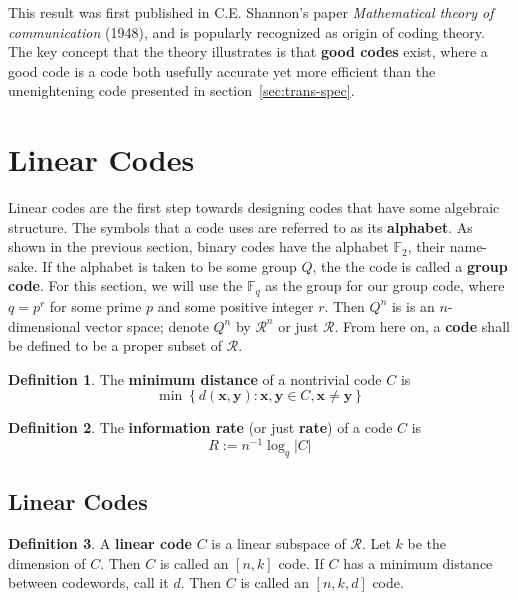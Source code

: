 \documentclass{article}
\newcommand{\F}{\mathbb{F}}
\newcommand{\calR}{\mathcal{R}}
\renewcommand{\=}{\equiv}
\renewcommand{\i}{^{-1}}
\newcommand{\set}[1]{\left\{ #1 \right\}}
\renewcommand{\v}{\mathbf}
\newcommand{\x}{{\v x}}
\newcommand{\y}{{\v y}}
\theoremstyle{plain}
\theoremstyle{definition}
\newtheorem{defn}{Definition}[subsection]
\begin{document}
This result was first published in C.E. Shannon's paper \textit{Mathematical theory of communication} (1948), and is popularly recognized as origin of coding theory.
The key concept that the theory illustrates is that \textbf{good codes} exist, where a good code is a code both usefully accurate yet more efficient than the unenightening code presented in section~\ref{sec:trans-spec}.


\section{Linear Codes}

Linear codes are the first step towards designing codes that have some algebraic structure.
The symbols that a code uses are referred to as its \textbf{alphabet}. As shown in the previous section, binary codes have the alphabet $\F_2$, their name-sake.
If the alphabet is taken to be some group $Q$, the the code is called a \textbf{group code}.
For this section, we will use the $\F_q$ as the group for our group code, where $q = p^r$ for some prime $p$ and some positive integer $r$.
Then $Q^n$ is is an $n$-dimensional vector space; denote $Q^n$ by $\calR^n$ or just $\calR$.
From here on, a \textbf{code} shall be defined to be a proper subset of $\calR$.

\begin{defn}
The \textbf{minimum distance} of a nontrivial code $C$ is
$$ \min\set{ d(\x, \y) : \x,\y \in C, \x \neq \y } $$
\end{defn}

\begin{defn}
The \textbf{information rate} (or just \textbf{rate}) of a code $C$ is
$$ R := n\i \log_q |C| $$
\end{defn}

\subsection{Linear Codes}

\begin{defn}
A \textbf{linear code} $C$ is a linear subspace of $\calR$.
Let $k$ be the dimension of $C$.
Then $C$ is called an $[n,k]$ code.
If $C$ has a minimum distance between codewords, call it $d$.
Then $C$ is called an $[n,k,d]$ code.
\end{defn}
\end{document}
